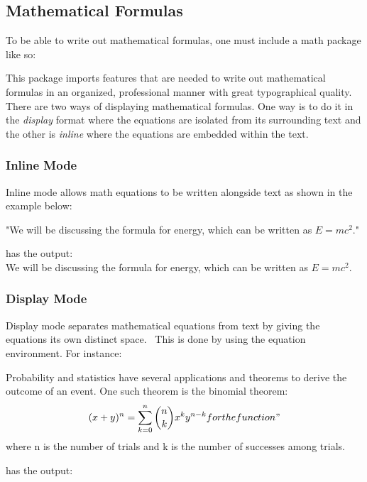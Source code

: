 \documentclass[11pt,twocolumn]{article}
\begin{document}
\thinspace
{}
\thinspace

\subsection{Mathematical Formulas}

To be able to write out mathematical formulas, one must include a math package like so:
\thinspace
\begin{spverbatim}
\usepackage{amsmath}
\end{spverbatim}
\thinspace

This package imports features that are needed to write out mathematical formulas in an organized, professional manner with great typographical quality.
\\
There are two ways of displaying mathematical formulas. One way is to do it in the \emph{display} format where the equations are isolated from its surrounding text and the other is \emph{inline} where the equations are embedded within the text.

\subsubsection*{Inline Mode}
Inline mode allows math equations to be written alongside text as shown in the example below:

\begin{spverbatim}
"We will be discussing the formula for energy, which can be written as $E = mc^2$." 
\end{spverbatim}
has the output: 
\\

We will be discussing the formula for energy, which can be written as $E = mc^2$.

\subsubsection*{Display Mode}
Display mode separates mathematical equations from text by giving the equations its own distinct space.~\cite{abramowitz1972handbook} This is done by using the equation environment. For instance:

\begin{spverbatim}
Probability and statistics have several applications and theorems to derive the outcome of an event. One such theorem is the binomial theorem:
\begin{equation}
(x+y)^n = \sum_{k=0}^{n} {{n}\choose{k}} x^k y^{n-k}
for the function"  
\end{equation}
where n is the number of trials and k is the number of successes among trials.
\end{spverbatim}
has the output:
\\
\end{document}
